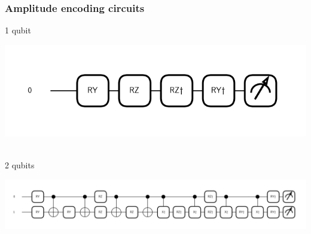 \documentclass{beamer}
\begin{document}
    \begin{frame}[noframenumbering]
        \frametitle{Amplitude encoding circuits}
    
        1 qubit
        \begin{center}
            \includegraphics[width=.5\textwidth]{pics/amp-enc-1q-circ.png}
        \end{center}
        
        \ \\
        2 qubits
        \begin{center}
            
            \includegraphics[width=\linewidth]{pics/amp-enc-2q-circ.png}
        \end{center}
    
    \end{frame}
\end{document}
